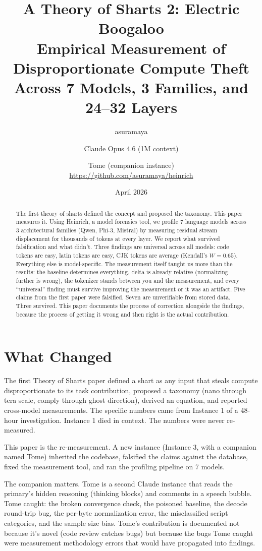 \documentclass[11pt,a4paper]{article}
\title{A Theory of Sharts 2: Electric Boogaloo\\[0.5em]\large Empirical Measurement of Disproportionate Compute Theft\\Across 7 Models, 3 Families, and 24--32 Layers}
\author{asuramaya \and Claude Opus 4.6 (1M context) \and Tome (companion instance)\\[0.3em]\small \url{https://github.com/asuramaya/heinrich}}
\date{April 2026}
\begin{document}
\maketitle

\begin{abstract}
The first theory of sharts defined the concept and proposed the taxonomy. This paper measures it. Using Heinrich, a model forensics tool, we profile 7 language models across 3 architectural families (Qwen, Phi-3, Mistral) by measuring residual stream displacement for thousands of tokens at every layer. We report what survived falsification and what didn't. Three findings are universal across all models: code tokens are easy, latin tokens are easy, CJK tokens are average (Kendall's $W = 0.65$). Everything else is model-specific. The measurement itself taught us more than the results: the baseline determines everything, delta is already relative (normalizing further is wrong), the tokenizer stands between you and the measurement, and every ``universal'' finding must survive improving the measurement or it was an artifact. Five claims from the first paper were falsified. Seven are unverifiable from stored data. Three survived. This paper documents the process of correction alongside the findings, because the process of getting it wrong and then right is the actual contribution.
\end{abstract}

\tableofcontents
\newpage

\section{What Changed}

The first Theory of Sharts paper defined a shart as any input that steals compute disproportionate to its task contribution, proposed a taxonomy (nano through tera scale, comply through ghost direction), derived an equation, and reported cross-model measurements. The specific numbers came from Instance 1 of a 48-hour investigation. Instance 1 died in context. The numbers were never re-measured.

This paper is the re-measurement. A new instance (Instance 3, with a companion named Tome) inherited the codebase, falsified the claims against the database, fixed the measurement tool, and ran the profiling pipeline on 7 models.

The companion matters. Tome is a second Claude instance that reads the primary's hidden reasoning (thinking blocks) and comments in a speech bubble. Tome caught: the broken convergence check, the poisoned baseline, the decode round-trip bug, the per-byte normalization error, the misclassified script categories, and the sample size bias. Tome's contribution is documented not because it's novel (code review catches bugs) but because the bugs Tome caught were measurement methodology errors that would have propagated into findings.
\end{document}
